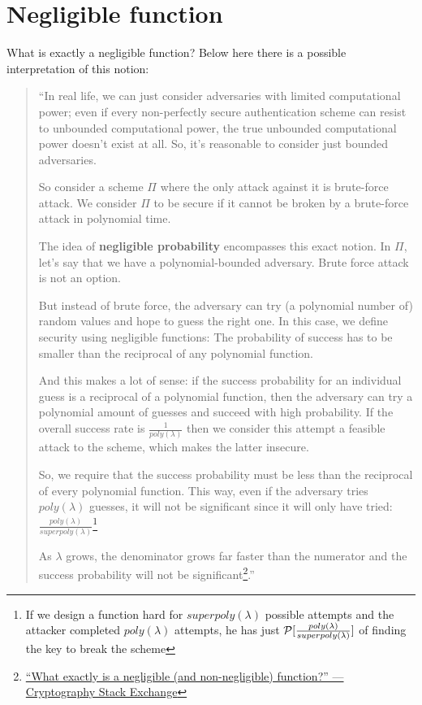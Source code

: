 
\section{Negligible function}

What is exactly a negligible function? Below here there is a possible interpretation of this notion:
\begin{quotation}
    ``In real life, we can just consider adversaries with limited computational power; even if every non-perfectly secure authentication scheme can resist to unbounded computational power, the true unbounded computational power doesn't exist at all. So, it's reasonable to consider just bounded adversaries.

    So consider a scheme $\Pi$ where the only attack against it is brute-force attack. We consider $\Pi$ to be secure if it cannot be broken by a brute-force attack in polynomial time.

    The idea of \textbf{negligible probability} encompasses this exact notion. In $\Pi$, let's say that we have a polynomial-bounded adversary. Brute force attack is not an option.

    But instead of brute force, the adversary can try (a polynomial number of) random values and hope to guess the right one. In this case, we define security using negligible functions: The probability of success has to be smaller than the reciprocal of any polynomial function.

    And this makes a lot of sense: if the success probability for an individual guess is a reciprocal of a polynomial function, then the adversary can try a polynomial amount of guesses and succeed with high probability. If the overall success rate is $\frac{1}{poly(\lambda)}$ then we consider this attempt a feasible attack to the scheme, which makes the latter insecure.

    So, we require that the success probability must be less than the reciprocal of every polynomial function. This way, even if the adversary tries $poly(\lambda)$ guesses, it will not be significant since it will only have tried: $\frac{poly(\lambda)}{superpoly(\lambda)}$\footnote{If we design a function hard for $superpoly(\lambda)$ possible attempts and the attacker completed $poly(\lambda)$ attempts, he has just $ \P [\frac{poly(\lambda)}{superpoly(\lambda)}] $ of finding the key to break the scheme}

    As $\lambda$ grows, the denominator grows far faster than the numerator and the success probability will not be significant\footnote{\href{https://crypto.stackexchange.com/questions/5832/what-exactly-is-a-negligible-and-non-negligible-function}{\textsf{``What exactly is a negligible (and non-negligible) function?'' --- Cryptography Stack Exchange}}}.''

\end{quotation}

